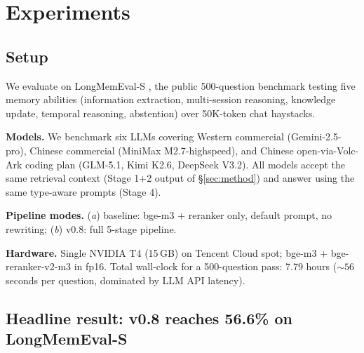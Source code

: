 
\section{Experiments}
\label{sec:eval}

\subsection{Setup}

We evaluate on LongMemEval-S \citep{wu2024longmemeval}, the public 500-question
benchmark testing five memory abilities (information extraction, multi-session
reasoning, knowledge update, temporal reasoning, abstention) over 50K-token
chat haystacks.

\textbf{Models.} We benchmark six LLMs covering Western commercial
(Gemini-2.5-pro), Chinese commercial (MiniMax M2.7-highspeed), and Chinese
open-via-Volc-Ark coding plan (GLM-5.1, Kimi K2.6, DeepSeek V3.2). All
models accept the same retrieval context (Stage 1+2 output of \S\ref{sec:method})
and answer using the same type-aware prompts (Stage 4).

\textbf{Pipeline modes.} (\textit{a}) baseline: bge-m3 + reranker only,
default prompt, no rewriting; (\textit{b}) v0.8: full 5-stage pipeline.

\textbf{Hardware.} Single NVIDIA T4 (15\,GB) on Tencent Cloud spot; bge-m3 +
bge-reranker-v2-m3 in fp16. Total wall-clock for a 500-question pass: 7.79
hours (\(\sim\)\(56\) seconds per question, dominated by LLM API latency).

\subsection{Headline result: v0.8 reaches 56.6\% on LongMemEval-S}

